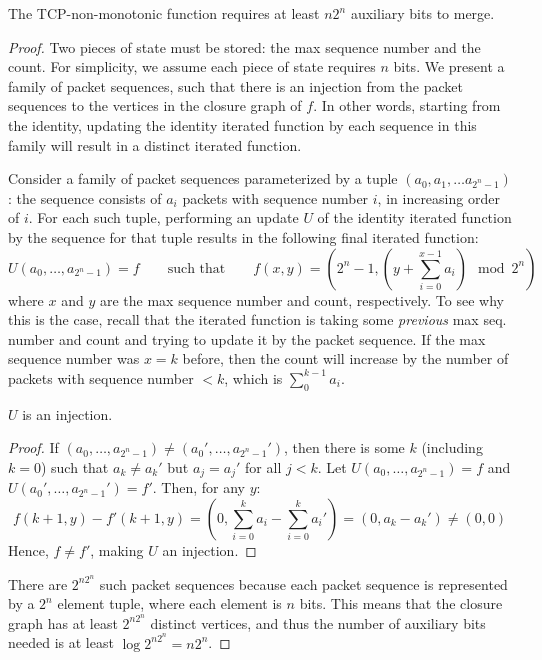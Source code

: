 \begin{theorem}
The TCP-non-monotonic function requires at least $n2^n$ auxiliary bits to merge.
\end{theorem}
\begin{proof}
Two pieces of state must be stored: the max sequence number and the count. For
simplicity, we assume each piece of state requires $n$ bits.
We present a family of packet sequences, such that there is an injection from the packet
 sequences to the vertices in the closure graph of $f$. In other words, starting from the identity, updating the identity iterated function by each sequence in this family will result in a distinct iterated function. 

Consider a family of packet sequences parameterized by a tuple $(a_0, a_1, \ldots a_{2^n-1})$: the sequence consists of $a_i$ packets with sequence number $i$, in increasing order of $i$. For each such tuple, performing an update $U$ of the identity iterated function by the sequence for that tuple results in the following final iterated function:
\[ U(a_0, \ldots, a_{2^n-1}) = f\quad\quad \text{such that} \quad\quad f(x,y) = \left(2^n - 1, (y + \sum_{i=0}^{x-1} a_i) \mod 2^n\right) \]
where $x$ and $y$ are the max sequence number and count, respectively. To see why this is the case, recall that the iterated function is taking some \emph{previous} max seq. number and count and trying to update it by the packet sequence. If the max sequence number was $x = k$ before, then the count will increase by the number of packets with sequence number $< k$, which is $\sum_0^{k-1} a_i$.
\begin{lemma}
$U$ is an injection.
\end{lemma}
\begin{proof}
If $(a_0, \ldots, a_{2^n-1}) \neq (a_0', \ldots, a_{2^n-1}')$, then there is
some $k$ (including $k=0$) such that $a_k \neq a_k'$ but $a_j = a_j'$ for all
$j < k$. Let $U(a_0, \ldots, a_{2^n-1}) = f$ and $U(a_0', \ldots, a_{2^n-1}') =
f'$. Then, for any $y$: \[ f(k+1, y) - f'(k+1,y) = \left(0, \sum_{i = 0}^k a_i
- \sum_{i = 0}^k a_i'\right) = (0, a_k - a_k') \neq (0, 0) \] Hence, $f \neq f'$,
making $U$ an injection.
\end{proof}
There are $2^{n2^n}$ such packet sequences because each packet sequence is
represented by a $2^n$ element tuple, where each element is $n$ bits. This
means that the closure graph has at least $2^{n2^n}$ distinct vertices, and
thus the number of auxiliary bits needed is at least $\log 2^{n2^n} = n2^n$. 
\end{proof}

